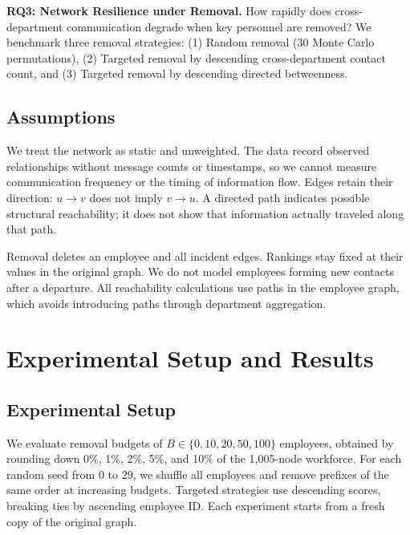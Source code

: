 \documentclass[conference]{IEEEtran}
\begin{document}
\textbf{RQ3: Network Resilience under Removal.} How rapidly does cross-department communication degrade when key personnel are removed? We benchmark three removal strategies: (1) Random removal (30 Monte Carlo permutations), (2) Targeted removal by descending cross-department contact count, and (3) Targeted removal by descending directed betweenness.

\subsection{Assumptions}
We treat the network as static and unweighted. The data record observed relationships without message counts or timestamps, so we cannot measure communication frequency or the timing of information flow. Edges retain their direction: $u\to v$ does not imply $v\to u$. A directed path indicates possible structural reachability; it does not show that information actually traveled along that path.

Removal deletes an employee and all incident edges. Rankings stay fixed at their values in the original graph. We do not model employees forming new contacts after a departure. All reachability calculations use paths in the employee graph, which avoids introducing paths through department aggregation.

\section{Experimental Setup and Results}

\subsection{Experimental Setup}
We evaluate removal budgets of $B \in \{0, 10, 20, 50, 100\}$ employees, obtained by rounding down 0\%, 1\%, 2\%, 5\%, and 10\% of the 1,005-node workforce. For each random seed from $0$ to $29$, we shuffle all employees and remove prefixes of the same order at increasing budgets. Targeted strategies use descending scores, breaking ties by ascending employee ID. Each experiment starts from a fresh copy of the original graph.
\end{document}
